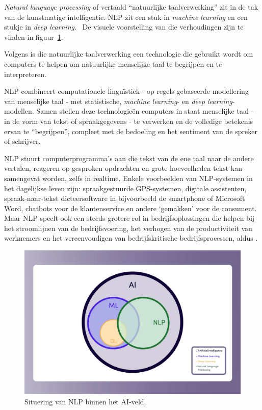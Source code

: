 \textit{Natural language processing} of vertaald ``natuurlijke taalverwerking'' zit in de tak van de kunstmatige intelligentie. NLP zit een stuk in \textit{machine learning} en een stukje in \textit{deep learning}.~\autocite{Kleinings2022} De visuele voorstelling van die verhoudingen zijn te vinden in figuur~\ref{fig:nlp_field}.

Volgens \textcite{Kleinings2022} is die natuurlijke taalverwerking een technologie die gebruikt wordt om computers te helpen om natuurlijke menselijke taal te begrijpen en te interpreteren.

NLP combineert computationele linguïstiek - op regels gebaseerde modellering van menselijke taal - met statistische, \textit{machine learning}- en \textit{deep learning}-modellen. Samen stellen deze technologieën computers in staat menselijke taal - in de vorm van tekst of spraakgegevens - te verwerken en de volledige betekenis ervan te ``begrijpen'', compleet met de bedoeling en het sentiment van de spreker of schrijver.~\autocite{IBMCloudEducation2021}

NLP stuurt computerprogramma's aan die tekst van de ene taal naar de andere vertalen, reageren op gesproken opdrachten en grote hoeveelheden tekst kan samengevat worden, zelfs in realtime. Enkele voorbeelden van NLP-systemen in het dagelijkse leven zijn: spraakgestuurde GPS-systemen, digitale assistenten, spraak-naar-tekst dicteersoftware in bijvoorbeeld de smartphone of Microsoft Word, chatbots voor de klantenservice en andere `gemakken' voor de consument. Maar NLP speelt ook een steeds grotere rol in bedrijfsoplossingen die helpen bij het stroomlijnen van de bedrijfsvoering, het verhogen van de productiviteit van werknemers en het vereenvoudigen van bedrijfskritische bedrijfsprocessen, aldus \textcite{IBMCloudEducation2021}.

\begin{figure}
    \centering
    \includegraphics[width=.8\textwidth]{./img/nlp_field_ai.jpeg}
    \caption{\label{fig:nlp_field} Situering van NLP binnen het AI-veld.~\autocite{Kleinings2022}}
\end{figure}

